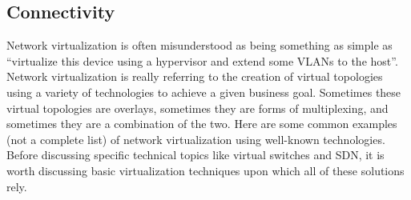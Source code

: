 \subsection{Connectivity}
Network virtualization is often misunderstood as being something as simple as
``virtualize this device using a hypervisor and extend some VLANs to the host''.
Network virtualization is really referring to the creation of virtual
topologies using a variety of technologies to achieve a given business goal.
Sometimes these virtual topologies are overlays, sometimes they are forms of
multiplexing, and sometimes they are a combination of the two. Here are some
common examples (not a complete list) of network virtualization using
well-known technologies. Before discussing specific technical topics like
virtual switches and SDN, it is worth discussing basic virtualization
techniques upon which all of these solutions rely.

